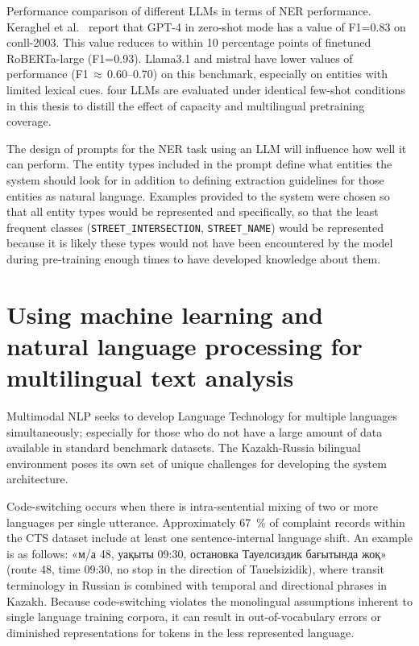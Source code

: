 Performance comparison of different LLMs in terms of NER performance. Keraghel et al.~\cite{keraghel2024survey} report that GPT-4 in zero-shot mode has a value of F1=0.83 on conll-2003. This value reduces to within 10 percentage points of finetuned RoBERTa-large (F1=0.93). Llama3.1 and mistral have lower values of performance (F1\,$\approx$\,0.60--0.70) on this benchmark, especially on entities with limited lexical cues. four LLMs are evaluated under identical few-shot conditions in this thesis to distill the effect of capacity and multilingual pretraining coverage.

The design of prompts for the NER task using an LLM will influence how well it can perform. The entity types included in the prompt define what entities the system should look for in addition to defining extraction guidelines for those entities as natural language. Examples provided to the system were chosen so that all entity types would be represented and specifically, so that the least frequent classes (\texttt{STREET\_INTERSECTION}, \texttt{STREET\_NAME}) would be represented because it is likely these types would not have been encountered by the model during pre-training enough times to have developed knowledge about them.

\section{Using machine learning and natural language processing for multilingual text analysis}
\label{sec:multilingual}

Multimodal NLP seeks to develop Language Technology for multiple languages simultaneously; especially for those who do not have a large amount of data available in standard benchmark datasets. The Kazakh-Russia bilingual environment poses its own set of unique challenges for developing the system architecture.

Code-switching occurs when there is intra-sentential mixing of two or more languages per single utterance. Approximately 67 \,\%  of complaint records within the CTS dataset include at least one sentence-internal language shift. An example is as follows: \foreignlanguage{russian}{«м/а 48, уақыты 09:30, остановка Тауелсиздик бағытында жоқ»} (route 48, time 09:30, no stop in the direction of Tauelsizidik), where transit terminology in Russian is combined with temporal and directional phrases in Kazakh. Because code-switching violates the monolingual assumptions inherent to single language training corpora, it can result in out-of-vocabulary errors or diminished representations for tokens in the less represented language.

